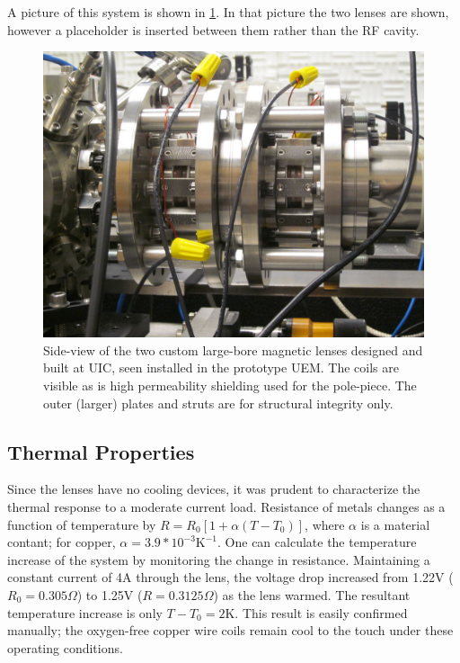 A picture of this system is shown in \ref{fig:maglens-pic}.
In that picture the two lenses are shown, however a placeholder is inserted between them rather than the RF cavity.

\begin{figure}
  \centering
  \includegraphics{maglens.jpg}
  \caption[Side-view picture of the employed two custom large-bore magnetic lenses]{
    Side-view of the two custom large-bore magnetic lenses designed and built at UIC, seen installed in the prototype UEM.
    The coils are visible as is high permeability shielding used for the pole-piece.
    The outer (larger) plates and struts are for structural integrity only.
  }
  \label{fig:maglens-pic}
\end{figure}

\subsection{Thermal Properties}

Since the lenses have no cooling devices, it was prudent to characterize the thermal response to a moderate current load.
Resistance of metals changes as a function of temperature by $ R = R_0 [ 1 + \alpha ( T - T_0 ) ] $, where $\alpha$ is a material contant; for copper, $\alpha = 3.9 * 10^{-3} \text{K}^{-1}$. 
One can calculate the temperature increase of the system by monitoring the change in resistance.
Maintaining a constant current of 4A through the lens, the voltage drop increased from 1.22V ($R_0 = 0.305\Omega$) to 1.25V ($R=0.3125\Omega$) as the lens warmed.
The resultant temperature increase is only $T - T_0 = 2\text{K}$.
This result is easily confirmed manually; the oxygen-free copper wire coils remain cool to the touch under these operating conditions.

